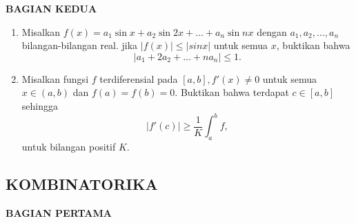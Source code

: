 \documentclass[12pt,twoside]{article}
\begin{document}
\newpage \textbf{BAGIAN KEDUA}
\begin{enumerate}
	\item Misalkan $f(x) = a_1 \sin x + a_2 \sin 2x +\dots+ a_n \sin nx$ dengan $a_1,a_2,\dots,a_n$ bilangan-bilangan real. jika $\left|f(x)\right| \leqslant \left|sin x\right|$ untuk semua $x$, buktikan bahwa
	      \begin{equation*}
		      \left|a_1+2a_2+\dots+na_n\right| \leqslant 1.
	      \end{equation*}


	\item Misalkan fungsi $f$ terdiferensial pada $\left[a,b\right], f'(x) \not= 0$ untuk semua $x \in (a,b)$ dan $f(a)=f(b)=0$. Buktikan bahwa terdapat $c \in \left[a,b\right] $ sehingga $$\left|f'(c)\right| \geq \frac{1}{K} \displaystyle\int_{a}^{b} f,$$ untuk bilangan positif $K$.
\end{enumerate}
\newpage \subsection{KOMBINATORIKA }
\textbf{BAGIAN PERTAMA}
\end{document}
